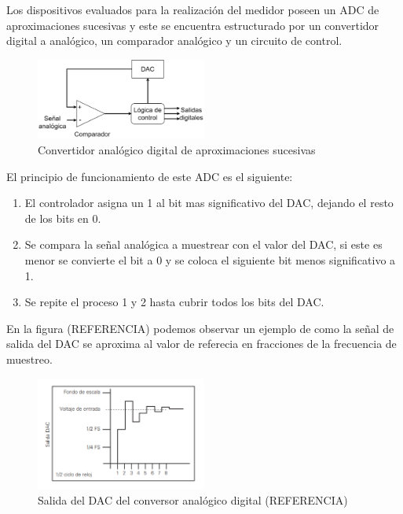           \par Los dispositivos evaluados para la realización del medidor poseen un ADC de aproximaciones sucesivas y este se encuentra estructurado por un convertidor digital a analógico, un comparador analógico y un circuito de control.

          \begin{figure}[H]
            \centering
            \includegraphics[width=0.5\textwidth]{../Imagenes/ADC.png}
            \caption{Convertidor analógico digital de aproximaciones sucesivas}
            \label{fig:ADC_aproximaciones_sucesivas}
          \end{figure}

          \par El principio de funcionamiento de este ADC es el siguiente:
          \begin{enumerate}
            \item El controlador asigna un 1 al bit mas significativo del DAC, dejando el resto de los bits en 0.
            \item Se compara la señal analógica a muestrear con el valor del DAC, si este es menor se convierte el bit a 0 y se coloca el siguiente bit menos significativo a 1.
            \item Se repite el proceso 1 y 2 hasta cubrir todos los bits del DAC.
          \end{enumerate}

          \par En la figura (REFERENCIA) podemos observar un ejemplo de como la señal de salida del DAC se aproxima al valor de referecia en fracciones de la frecuencia de muestreo.

          \begin{figure}[H]
            \centering
            \includegraphics[width=0.5\textwidth]{../Imagenes/ADC_ejemplo.png}
            \caption{Salida del DAC del conversor analógico digital (REFERENCIA)}
            \label{fig:ADC_DAC_ejemplo}
          \end{figure}


